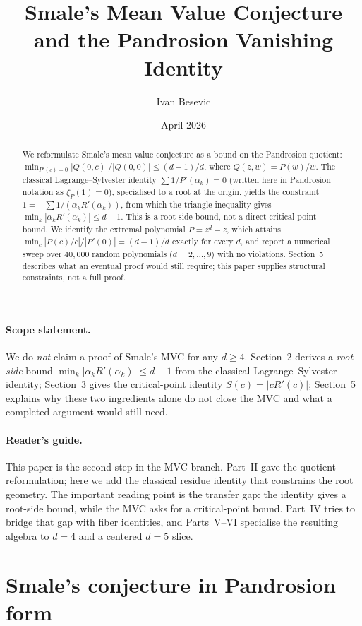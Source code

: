 \documentclass[11pt,a4paper]{article}
\title{Smale's Mean Value Conjecture \\ and the Pandrosion Vanishing Identity}
\author{Ivan Besevic}
\date{April 2026}
\begin{document}
\maketitle

\begin{abstract}
We reformulate Smale's mean value conjecture as a bound on the Pandrosion quotient: $\min_{P'(c) = 0} |Q(0, c)|/|Q(0, 0)| \le (d - 1)/d$, where $Q(z, w) = P(w)/w$. The classical Lagrange--Sylvester identity $\sum 1/P'(\alpha_k) = 0$ (written here in Pandrosion notation as $\zeta_P(1) = 0$), specialised to a root at the origin, yields the constraint $1 = -\sum 1/(\alpha_k R'(\alpha_k))$, from which the triangle inequality gives $\min_k |\alpha_k R'(\alpha_k)| \le d - 1$. This is a root-side bound, not a direct critical-point bound. We identify the extremal polynomial $P = z^d - z$, which attains $\min_c |P(c)/c|/|P'(0)| = (d - 1)/d$ exactly for every $d$, and report a numerical sweep over $40{,}000$ random polynomials ($d = 2, \dots, 9$) with no violations. Section~5 describes what an eventual proof would still require; this paper supplies structural constraints, not a full proof.
\end{abstract}

\paragraph{Scope statement.} We do \emph{not} claim a proof of Smale's MVC for any $d \ge 4$. Section~2 derives a \emph{root-side} bound $\min_k |\alpha_k R'(\alpha_k)| \le d - 1$ from the classical Lagrange--Sylvester identity; Section~3 gives the critical-point identity $S(c) = |c R'(c)|$; Section~5 explains why these two ingredients alone do not close the MVC and what a completed argument would still need.

\paragraph{Reader's guide.}
This paper is the second step in the MVC branch. Part~II gave the quotient
reformulation; here we add the classical residue identity that constrains the
root geometry. The important reading point is the transfer gap: the identity
gives a root-side bound, while the MVC asks for a critical-point bound. Part~IV
tries to bridge that gap with fiber identities, and Parts~V--VI specialise the
resulting algebra to $d=4$ and a centered $d=5$ slice.

\section{Smale's conjecture in Pandrosion form}
\end{document}
